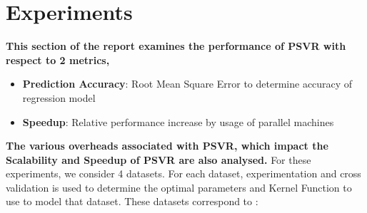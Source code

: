 \documentclass[12pt]{article}
\begin{document}
\section{Experiments}
{\bf This section of the report examines the performance of PSVR with respect to 2 metrics,}
\begin{itemize}
\item  {\bf Prediction Accuracy}: Root Mean Square Error to determine accuracy of regression model
\item {\bf Speedup}: Relative performance increase by usage of parallel machines
\end{itemize}
{\bf The various overheads associated with PSVR, which impact the Scalability and Speedup of PSVR are also analysed.}
\newline\newline
For these experiments, we consider 4 datasets. For each dataset, experimentation and cross validation is used to determine the optimal parameters and Kernel Function to use to model that dataset. These datasets correspond to : 
\end{document}
